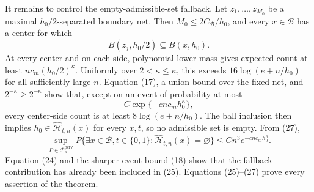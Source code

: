 It remains to control the empty-admissible-set fallback.  Let \(z_1,\ldots,z_{M_0}\) be a maximal \(h_0/2\)-separated boundary net.  Then \(M_0\le2C_{\mathcal B}/h_0\), and every \(x\in\mathcal B\) has a center for which
\[
 B(z_j,h_0/2)\subseteq B(x,h_0).
\]
At every center and on each side, polynomial lower mass gives expected count at least \(nc_m(h_0/2)^\kappa\).  Uniformly over \(2<\kappa\le\overline\kappa\), this exceeds \(16\log(e+n/h_0)\) for all sufficiently large \(n\).  Equation (17), a union bound over the fixed net, and \(2^{-\kappa}\ge2^{-\overline\kappa}\) show that, except on an event of probability at most
\[
 C\exp\{-c n c_mh_0^\kappa\}, \tag{27}
\]
every center-side count is at least \(8\log(e+n/h_0)\).  The ball inclusion then implies \(h_0\in\widehat{\mathcal H}_{t,n}(x)\) for every \(x,t\), so no admissible set is empty.  From (27),
\[
 \sup_{P\in\mathcal P_\kappa^{\mathrm{perv}}}
 P\{\exists x\in\mathcal B,t\in\{0,1\}:\widehat{\mathcal H}_{t,n}(x)=\varnothing\}
 \le Cn^3e^{-c n c_mh_0^\kappa}.
\]
Equation (24) and the sharper event bound (18) show that the fallback contribution has already been included in (25).  Equations (25)--(27) prove every assertion of the theorem.